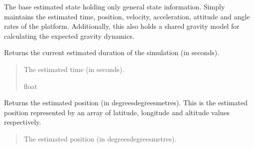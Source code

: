 \documentclass[letterpaper,10pt,english]{sphinxmanual}
\begin{document}
\begin{fulllineitems}
\label{\detokenize{modules/estimation/state:qnav.estimation.state.EstimatedState}}
\pysigstartsignatures
{}
\pysigstopsignatures
\sphinxAtStartPar
The base estimated state holding only general state information.
Simply maintains the estimated time, position, velocity, acceleration,
attitude and angle rates of the platform. Additionally, this also holds
a shared gravity model for calculating the expected gravity dynamics.

\begin{fulllineitems}
\label{\detokenize{modules/estimation/state:qnav.estimation.state.EstimatedState.timestamp}}
\pysigstartsignatures
{}
\pysigstopsignatures
\sphinxAtStartPar
Returns the current estimated duration of the simulation (in seconds).
\begin{quote}\begin{description}
\sphinxAtStartPar
The estimated time (in seconds).

\sphinxAtStartPar
float

\end{description}\end{quote}

\end{fulllineitems}


\begin{fulllineitems}
\label{\detokenize{modules/estimation/state:qnav.estimation.state.EstimatedState.position}}
\pysigstartsignatures
{}
\pysigstopsignatures
\sphinxAtStartPar
Returns the estimated position (in degrees\sphinxhyphen{}degrees\sphinxhyphen{}metres).
This is the estimated position represented by an array of latitude,
longitude and altitude values respectively.
\begin{quote}\begin{description}
\sphinxAtStartPar
The estimated position (in degrees\sphinxhyphen{}degrees\sphinxhyphen{}metres).


\end{description}
\end{quote}
\end{fulllineitems}
\end{fulllineitems}
\end{document}

